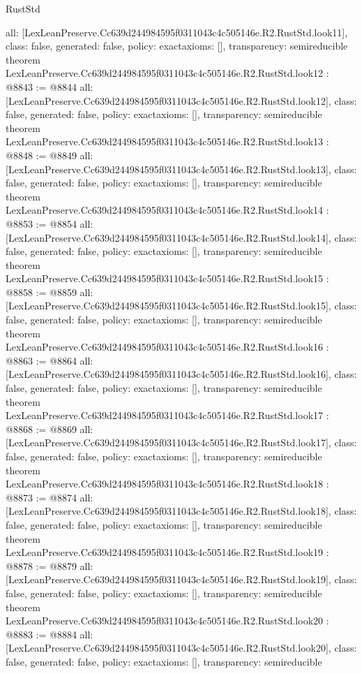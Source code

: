 \begin{lexlean}{RustStd}
\begin{coremodule}
{  all: [LexLeanPreserve.Cc639d244984595f0311043c4c505146e.R2.RustStd.look11],
  class: false,
  generated: false,
  policy: exact{axioms: []},
  transparency: semireducible
}
theorem LexLeanPreserve.Cc639d244984595f0311043c4c505146e.R2.RustStd.look12 : @8843 := @8844 {
  all: [LexLeanPreserve.Cc639d244984595f0311043c4c505146e.R2.RustStd.look12],
  class: false,
  generated: false,
  policy: exact{axioms: []},
  transparency: semireducible
}
theorem LexLeanPreserve.Cc639d244984595f0311043c4c505146e.R2.RustStd.look13 : @8848 := @8849 {
  all: [LexLeanPreserve.Cc639d244984595f0311043c4c505146e.R2.RustStd.look13],
  class: false,
  generated: false,
  policy: exact{axioms: []},
  transparency: semireducible
}
theorem LexLeanPreserve.Cc639d244984595f0311043c4c505146e.R2.RustStd.look14 : @8853 := @8854 {
  all: [LexLeanPreserve.Cc639d244984595f0311043c4c505146e.R2.RustStd.look14],
  class: false,
  generated: false,
  policy: exact{axioms: []},
  transparency: semireducible
}
theorem LexLeanPreserve.Cc639d244984595f0311043c4c505146e.R2.RustStd.look15 : @8858 := @8859 {
  all: [LexLeanPreserve.Cc639d244984595f0311043c4c505146e.R2.RustStd.look15],
  class: false,
  generated: false,
  policy: exact{axioms: []},
  transparency: semireducible
}
theorem LexLeanPreserve.Cc639d244984595f0311043c4c505146e.R2.RustStd.look16 : @8863 := @8864 {
  all: [LexLeanPreserve.Cc639d244984595f0311043c4c505146e.R2.RustStd.look16],
  class: false,
  generated: false,
  policy: exact{axioms: []},
  transparency: semireducible
}
theorem LexLeanPreserve.Cc639d244984595f0311043c4c505146e.R2.RustStd.look17 : @8868 := @8869 {
  all: [LexLeanPreserve.Cc639d244984595f0311043c4c505146e.R2.RustStd.look17],
  class: false,
  generated: false,
  policy: exact{axioms: []},
  transparency: semireducible
}
theorem LexLeanPreserve.Cc639d244984595f0311043c4c505146e.R2.RustStd.look18 : @8873 := @8874 {
  all: [LexLeanPreserve.Cc639d244984595f0311043c4c505146e.R2.RustStd.look18],
  class: false,
  generated: false,
  policy: exact{axioms: []},
  transparency: semireducible
}
theorem LexLeanPreserve.Cc639d244984595f0311043c4c505146e.R2.RustStd.look19 : @8878 := @8879 {
  all: [LexLeanPreserve.Cc639d244984595f0311043c4c505146e.R2.RustStd.look19],
  class: false,
  generated: false,
  policy: exact{axioms: []},
  transparency: semireducible
}
theorem LexLeanPreserve.Cc639d244984595f0311043c4c505146e.R2.RustStd.look20 : @8883 := @8884 {
  all: [LexLeanPreserve.Cc639d244984595f0311043c4c505146e.R2.RustStd.look20],
  class: false,
  generated: false,
  policy: exact{axioms: []},
  transparency: semireducible
}
\end{coremodule}
\end{lexlean}

